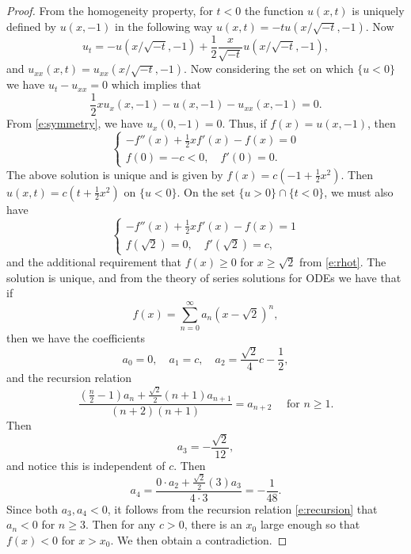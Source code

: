 \documentclass{amsart}
\numberwithin{equation}{section}
\begin{document}
\begin{proof}
    From the homogeneity property, for $t<0$ the function $u(x,t)$ is uniquely defined by $u(x,-1)$ in the following way $u(x,t)=-tu(x/\sqrt{-t},-1)$.
    Now \[
    u_t = -u(x/\sqrt{-t},-1) + \frac{1}{2}\frac{x}{\sqrt{-t}}u(x/\sqrt{-t},-1),
    \]
    and $u_{xx}(x,t)=u_{xx}(x/\sqrt{-t},-1)$. 
    Now considering the set on which $\{u<0\}$ we have $u_t -  u_{xx}=0$ which implies that 
    \[
    \frac{1}{2}x u_x(x,-1) - u(x,-1) - u_{xx}(x,-1)=0. 
    \]
    From \eqref{e:symmetry}, we have $u_x(0,-1)=0$. 
    Thus, if $f(x)=u(x,-1)$, then 
    \[
    \begin{cases}
        -f''(x)+\frac{1}{2}xf'(x)-f(x)=0 \\
        f(0)=-c<0, \quad f'(0)=0.
    \end{cases}
    \]
    The above solution is unique and is given by $f(x)=c(-1+\frac{1}{2}x^2)$. Then $u(x,t)=c(t+\frac{1}{2}x^2)$ on $\{u<0\}$. On the set $\{u>0\}\cap \{t<0\}$, we must also have 
    \[
     \begin{cases}
        -f''(x)+\frac{1}{2}xf'(x)-f(x)=1 \\
        f(\sqrt{2})=0, \quad f'(\sqrt{2})=c,
    \end{cases}
    \]
    and the additional requirement that $f(x)\geq 0$ for $x\geq \sqrt{2}$ from \eqref{e:rhot}. 
    The solution is unique, and from the theory of series solutions for ODEs we have that if 
    \[
    f(x)=\sum_{n=0}^{\infty} a_n (x-\sqrt{2})^n, 
    \]
    then we have the coefficients
    \[
     a_0=0, \quad a_1=c, \quad a_2 = \frac{\sqrt{2}}{4}c - \frac{1}{2},
    \]
    and the recursion relation
    \begin{equation} \label{e:recursion}
    \frac{\left(\frac{n}{2}-1 \right)a_n +\frac{\sqrt{2}}{2}(n+1)a_{n+1}}{(n+2)(n+1)}=a_{n+2} \quad \text{ for } n \geq 1. 
    \end{equation}
    Then 
    \[
    a_3= -\frac{\sqrt{2}}{12},
    \]
    and notice this is independent of $c$. Then
    \[
    a_4 = \frac{0 \cdot a_2 + \frac{\sqrt{2}}{2}(3)a_3}{4\cdot 3}=-\frac{1}{48}. 
    \]
    Since both $a_3,a_4 <0$, it follows from the recursion relation \eqref{e:recursion} that $a_n <0$ for $n \geq 3$. Then for any $c>0$, there is an $x_0$ large enough so that $f(x)<0$ for $x>x_0$. We then obtain a contradiction. 
\end{proof}
\end{document}
